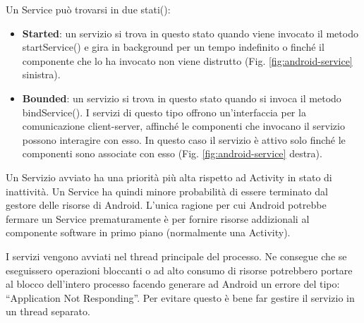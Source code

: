 Un Service può trovarsi in due stati(\cite{emanuele:android}):

\begin{itemize}
	\item \textbf{Started}: un servizio si trova in questo stato quando viene invocato il metodo startService() e gira in background per un tempo indefinito o finché il componente che lo ha invocato non viene distrutto (Fig. \ref{fig:android-service} sinistra).
	\item \textbf{Bounded}: un servizio si trova in questo stato quando si invoca il metodo bindService(). I servizi di questo tipo offrono un'interfaccia per la comunicazione client-server, affinché le componenti che invocano il servizio possono interagire con esso. In questo caso il servizio è attivo solo finché le componenti sono associate con esso (Fig. \ref{fig:android-service} destra).
\end{itemize}

\noindent
Un Servizio avviato ha una priorità più alta rispetto ad Activity in stato di inattività. Un Service ha quindi minore probabilità di essere terminato dal gestore delle risorse di Android. L'unica ragione per cui Android potrebbe fermare un Service prematuramente è per fornire risorse addizionali al componente software in primo piano (normalmente una Activity).

I servizi vengono avviati nel thread principale del processo. Ne consegue che se eseguissero operazioni bloccanti o ad alto consumo di risorse potrebbero portare al blocco dell'intero processo facendo generare ad Android un errore del tipo: ``Application Not Responding''. Per evitare questo è bene far gestire il servizio in un thread separato.

